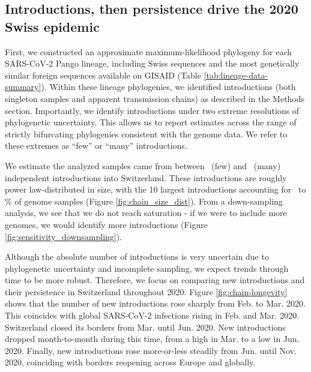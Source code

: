\documentclass[9pt,twoside,lineno]{pnas-new} %
\begin{document}
\subsection{Introductions, then persistence drive the 2020 Swiss epidemic}

First, we constructed an approximate maximum-likelihood phylogeny for each SARS-CoV-2 Pango lineage, including Swiss sequences and the most genetically similar foreign sequences available on GISAID (Table \ref{tab:lineage-data-summary}). Within these lineage phylogenies, we identified introductions (both singleton samples and apparent transmission chains) as described in the Methods section. Importantly, we identify introductions under two extreme resolutions of phylogenetic uncertainty. This allows us to report estimates across the range of strictly bifurcating phylogenies consistent with the genome data. We refer to these extremes as ``few'' or ``many'' introductions.

We estimate the analyzed samples came from between \nchainsmin\ (few) and \nchainsmax\ (many) independent introductions into Switzerland. These introductions are roughly power law-distributed in size, with the 10 largest introductions accounting for \maxlargestchainsper\ to \minlargestchainsper \% of genome samples (Figure \ref{fig:chain_size_dist}). From a down-sampling analysis, we see that we do not reach saturation - if we were to include more genomes, we would identify more introductions (Figure \ref{fig:sensitivity_downsampling}). 


Although the absolute number of introductions is very uncertain due to phylogenetic uncertainty and incomplete sampling, we expect trends through time to be more robust. Therefore, we focus on comparing new introductions and their persistence in Switzerland throughout 2020. Figure \ref{fig:chain-longevity} shows that the number of new introductions rose sharply from Feb. to Mar. 2020. This coincides with global SARS-CoV-2 infections rising in Feb. and Mar. 2020. Switzerland closed its borders from Mar. until Jun. 2020. New introductions dropped month-to-month during this time, from a high in Mar. to a low in Jun. 2020. Finally, new introductions rose more-or-less steadily from Jun. until Nov. 2020, coinciding with borders reopening across Europe and globally. 
\end{document}
